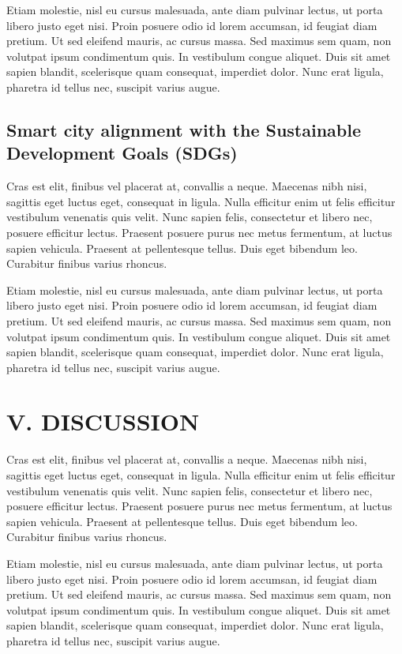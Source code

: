 \documentclass[a4paper,fleqn,spanish]{cas-dc}
\begin{document}
Etiam molestie, nisl eu cursus malesuada, ante diam pulvinar lectus, ut porta
libero justo eget nisi. Proin posuere odio id lorem accumsan, id feugiat diam
pretium. Ut sed eleifend mauris, ac cursus massa. Sed maximus sem quam, non
volutpat ipsum condimentum quis. In vestibulum congue aliquet. Duis sit amet
sapien blandit, scelerisque quam consequat, imperdiet dolor. Nunc erat ligula,
pharetra id tellus nec, suscipit varius augue.


\subsection{Smart city alignment with the Sustainable Development Goals (SDGs)}\label{sustentabilidad}

Cras est elit, finibus vel placerat at, convallis a neque. Maecenas nibh nisi,
sagittis eget luctus eget, consequat in ligula. Nulla efficitur enim ut felis
efficitur vestibulum venenatis quis velit. Nunc sapien felis, consectetur et
libero nec, posuere efficitur lectus. Praesent posuere purus nec metus
fermentum, at luctus sapien vehicula. Praesent at pellentesque tellus. Duis eget
bibendum leo. Curabitur finibus varius rhoncus.

Etiam molestie, nisl eu cursus malesuada, ante diam pulvinar lectus, ut porta
libero justo eget nisi. Proin posuere odio id lorem accumsan, id feugiat diam
pretium. Ut sed eleifend mauris, ac cursus massa. Sed maximus sem quam, non
volutpat ipsum condimentum quis. In vestibulum congue aliquet. Duis sit amet
sapien blandit, scelerisque quam consequat, imperdiet dolor. Nunc erat ligula,
pharetra id tellus nec, suscipit varius augue.


\section{V. DISCUSSION}\label{discusion}

Cras est elit, finibus vel placerat at, convallis a neque. Maecenas nibh nisi,
sagittis eget luctus eget, consequat in ligula. Nulla efficitur enim ut felis
efficitur vestibulum venenatis quis velit. Nunc sapien felis, consectetur et
libero nec, posuere efficitur lectus. Praesent posuere purus nec metus
fermentum, at luctus sapien vehicula. Praesent at pellentesque tellus. Duis eget
bibendum leo. Curabitur finibus varius rhoncus.

Etiam molestie, nisl eu cursus malesuada, ante diam pulvinar lectus, ut porta
libero justo eget nisi. Proin posuere odio id lorem accumsan, id feugiat diam
pretium. Ut sed eleifend mauris, ac cursus massa. Sed maximus sem quam, non
volutpat ipsum condimentum quis. In vestibulum congue aliquet. Duis sit amet
sapien blandit, scelerisque quam consequat, imperdiet dolor. Nunc erat ligula,
pharetra id tellus nec, suscipit varius augue.
\end{document}

